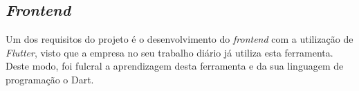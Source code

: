 \subsection{\textit{Frontend}}
Um dos requisitos do projeto é o desenvolvimento do \textit{frontend} com a utilização de \textit{Flutter}, visto que a empresa no seu trabalho diário já utiliza esta ferramenta. Deste modo, foi fulcral a aprendizagem desta ferramenta e da sua linguagem de programação o Dart.







